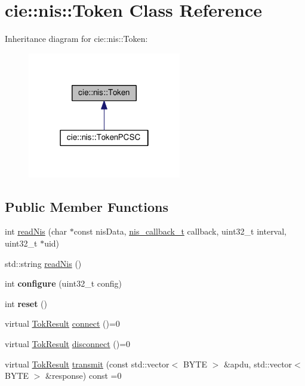 \hypertarget{classcie_1_1nis_1_1Token}{\section{cie\-:\-:nis\-:\-:Token Class Reference}
\label{classcie_1_1nis_1_1Token}
}


Inheritance diagram for cie\-:\-:nis\-:\-:Token\-:
\nopagebreak
\begin{figure}[H]
\begin{center}
\leavevmode
\includegraphics[width=190pt]{classcie_1_1nis_1_1Token__inherit__graph}
\end{center}
\end{figure}
\subsection*{Public Member Functions}
\begin{DoxyCompactItemize}
\item 
int \hyperlink{classcie_1_1nis_1_1Token_ae677403b3b8074b908cb416741f93e9e}{read\-Nis} (char $\ast$const nis\-Data, \hyperlink{nis__types_8h_a01a69b218db702baa14290be05ef112d}{nis\-\_\-callback\-\_\-t} callback, uint32\-\_\-t interval, uint32\-\_\-t $\ast$uid)
\item 
std\-::string \hyperlink{classcie_1_1nis_1_1Token_a3c246d7e4a06c864bcadc6db97d1870e}{read\-Nis} ()
\item 
\hypertarget{classcie_1_1nis_1_1Token_ab9147907b6d02c2361c2df2212d17a4d}{int {\bfseries configure} (uint32\-\_\-t config)}\label{classcie_1_1nis_1_1Token_ab9147907b6d02c2361c2df2212d17a4d}

\item 
\hypertarget{classcie_1_1nis_1_1Token_a249238a0e7a79237d443bb42bee06b6f}{int {\bfseries reset} ()}\label{classcie_1_1nis_1_1Token_a249238a0e7a79237d443bb42bee06b6f}

\item 
virtual \hyperlink{nis__types_8h_a6ef53483e8ce2f8bc58bd1f75b3d0b38}{Tok\-Result} \hyperlink{classcie_1_1nis_1_1Token_ab7a55406f6b9b15a39d70e64bab0042f}{connect} ()=0
\item 
virtual \hyperlink{nis__types_8h_a6ef53483e8ce2f8bc58bd1f75b3d0b38}{Tok\-Result} \hyperlink{classcie_1_1nis_1_1Token_a851b111864dade8826daa21920fa7cdf}{disconnect} ()=0
\item 
virtual \hyperlink{nis__types_8h_a6ef53483e8ce2f8bc58bd1f75b3d0b38}{Tok\-Result} \hyperlink{classcie_1_1nis_1_1Token_a90c1d8936133fc35b1826b7eebbd13ff}{transmit} (const std\-::vector$<$ B\-Y\-T\-E $>$ \&apdu, std\-::vector$<$ B\-Y\-T\-E $>$ \&response) const =0
\end{DoxyCompactItemize}


